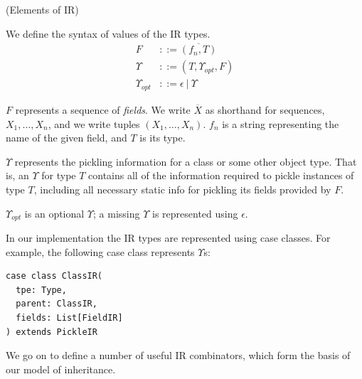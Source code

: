 \documentclass[10pt]{sigplanconf}
\theoremstyle{definition}
\theoremstyle{definition}
\begin{document}
\begin{defn}{(Elements of IR)}
\label{def:elems-ir}

We define the syntax of values of the IR types.
\vspace{-0.3em}
\begin{align*}
F&        ::= \overline{(f_n, T)}\\
\Upsilon&       ::= (T, \Upsilon_{opt}, F)\\
\Upsilon_{opt}& ::= \epsilon~|~\Upsilon
\end{align*}

$F$ represents a sequence of \textit{fields}. We write $\overline{X}$ as
shorthand for sequences, $X_1,\dots,X_n$, and we write tuples
$(X_1,\dots,X_n)$. $f_n$ is a string representing the name of the given field,
and $T$ is its type.

$\Upsilon$ represents the pickling information for a class or some other object
type. That is, an $\Upsilon$ for type $T$ contains all of the information required
to pickle instances of type $T$, including all necessary static info for
pickling its fields provided by $F$.

$\Upsilon_{opt}$ is an optional $\Upsilon$; a missing $\Upsilon$ is represented using $\epsilon$.
\end{defn}

\noindent In our implementation the IR types are represented using case classes. For
example, the following case class represents $\Upsilon$s:


\begin{lstlisting}
case class ClassIR(
  tpe: Type,
  parent: ClassIR,
  fields: List[FieldIR]
) extends PickleIR
\end{lstlisting}

We go on to define a number of useful IR combinators, which form the
basis of our model of inheritance.



\vspace{1em}
\end{document}
